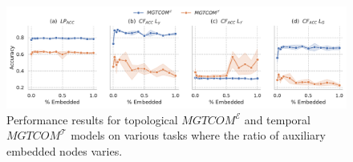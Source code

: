 \begin{figure}[ht]
\centering

\includegraphics[width=\columnwidth]{resources/figs/embed_ratio.pdf}

\caption{
Performance results for topological $MGTCOM^{\mathcal{E}}$ and temporal $MGTCOM^{\mathcal{T}}$ models on various tasks where the ratio of auxiliary embedded nodes varies.
}
\label{fig:abl_embed_ratio}
\end{figure}